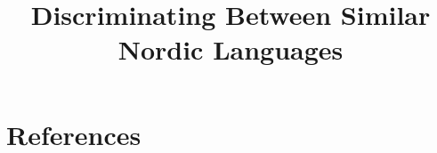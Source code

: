 \documentclass[10pt, a4paper]{article}
\title{Discriminating Between Similar Nordic Languages}
\begin{document}
\maketitleabstract













\section{References}
\label{main:ref}



\end{document}
